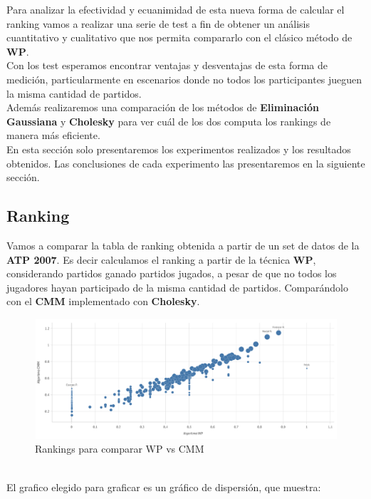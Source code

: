 Para analizar la efectividad y ecuanimidad de esta nueva forma de calcular el ranking vamos a realizar una serie de test a fin de obtener un análisis cuantitativo y cualitativo 
que nos permita compararlo con el clásico método de \textbf{WP}. \\
Con los test esperamos encontrar ventajas y desventajas de esta forma de medición, particularmente en escenarios donde no todos los participantes jueguen la misma cantidad de partidos.
\\

Además realizaremos una comparación de los métodos de \textbf{Eliminación Gaussiana} y \textbf{Cholesky} para ver cuál de los dos computa los rankings de manera más eficiente.
\\

En esta sección solo presentaremos los experimentos realizados y los resultados obtenidos. Las conclusiones de cada experimento
las presentaremos en la siguiente sección. 

\subsection{Ranking}

Vamos a comparar la tabla de ranking obtenida a partir de un set de datos de la \textbf{ATP 2007}. Es decir calculamos el ranking a partir de la técnica \textbf{WP}, considerando 
partidos ganado \/ partidos jugados, a pesar de que no todos los jugadores hayan participado de la misma cantidad de partidos. Comparándolo con el \textbf{CMM} implementado con \textbf{Cholesky}. \\


\begin{figure}[H]
\centering
\includegraphics[width=1\textwidth]{IMG/Comparativa WP- CMM todos.png}
\caption{Rankings para comparar WP vs CMM}
\label{fig:Comparacion de tecnicas}
\end{figure}

\\
El grafico elegido para graficar es un gráfico de dispersión, que muestra: \\

